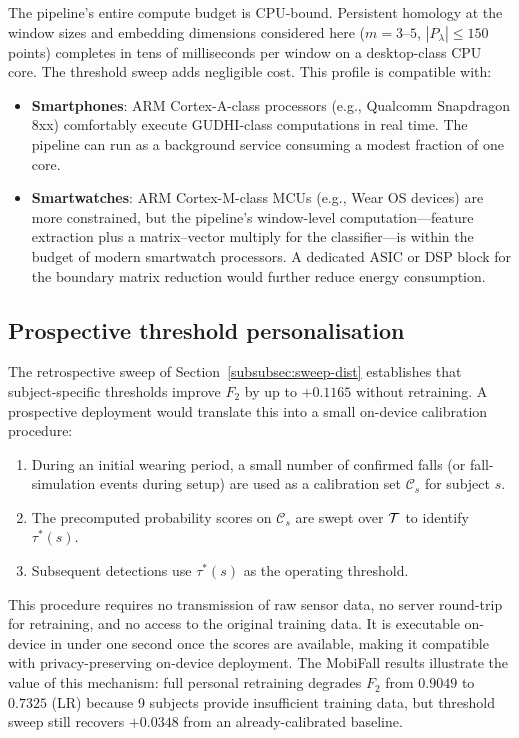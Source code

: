 The pipeline's entire compute budget is CPU-bound.  Persistent homology at the
window sizes and embedding dimensions considered here ($m=3$--$5$,
$|P_\lambda|\leq150$ points) completes in tens of milliseconds per window on a
desktop-class CPU core.  The threshold sweep adds negligible cost.  This profile is
compatible with:
\begin{itemize}
  \item \textbf{Smartphones}: ARM Cortex-A-class processors (e.g., Qualcomm
    Snapdragon 8xx) comfortably execute GUDHI-class computations in real time.
    The pipeline can run as a background service consuming a modest fraction of
    one core.
  \item \textbf{Smartwatches}: ARM Cortex-M-class MCUs (e.g., Wear OS devices)
    are more constrained, but the pipeline's window-level computation---feature
    extraction plus a matrix--vector multiply for the classifier---is within the
    budget of modern smartwatch processors.  A dedicated ASIC or DSP block for the
    boundary matrix reduction would further reduce energy consumption.
\end{itemize}

\subsection{Prospective threshold personalisation}

The retrospective sweep of Section~\ref{subsubsec:sweep-dist} establishes that
subject-specific thresholds improve $F_2$ by up to $+0.1165$ without retraining.
A prospective deployment would translate this into a small on-device calibration
procedure:
\begin{enumerate}
  \item During an initial wearing period, a small number of confirmed falls (or
    fall-simulation events during setup) are used as a calibration set $\mathcal{C}_s$
    for subject $s$.
  \item The precomputed probability scores on $\mathcal{C}_s$ are swept over
    $\mathcal{T}$ to identify $\tau^*(s)$.
  \item Subsequent detections use $\tau^*(s)$ as the operating threshold.
\end{enumerate}
This procedure requires no transmission of raw sensor data, no server round-trip for
retraining, and no access to the original training data.  It is executable on-device
in under one second once the scores are available, making it compatible with
privacy-preserving on-device deployment.  The MobiFall results illustrate the value
of this mechanism: full personal retraining degrades $F_2$ from $0.9049$ to $0.7325$
(LR) because 9 subjects provide insufficient training data, but threshold sweep
still recovers $+0.0348$ from an already-calibrated baseline.

